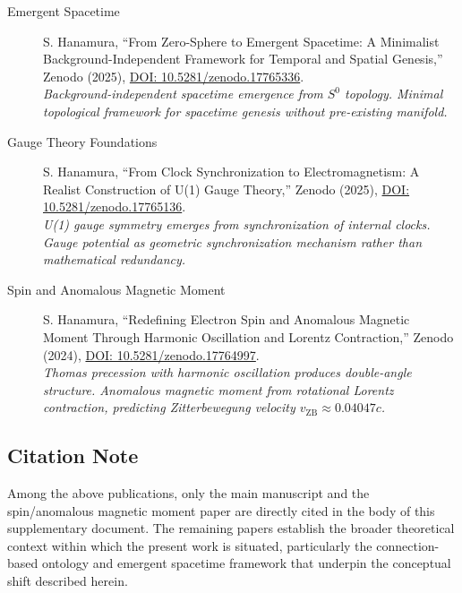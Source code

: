 \documentclass[12pt,letterpaper]{article}
\begin{document}
\begin{description}
\item[Emergent Spacetime] S. Hanamura, ``From Zero-Sphere to Emergent Spacetime: A Minimalist Background-Independent Framework for Temporal and Spatial Genesis,'' Zenodo (2025), \href{https://doi.org/10.5281/zenodo.17765336}{DOI: 10.5281/zenodo.17765336}. \\
\textit{Background-independent spacetime emergence from $S^0$ topology. Minimal topological framework for spacetime genesis without pre-existing manifold.}

\item[Gauge Theory Foundations] S. Hanamura, ``From Clock Synchronization to Electromagnetism: A Realist Construction of U(1) Gauge Theory,'' Zenodo (2025), \href{https://doi.org/10.5281/zenodo.17765136}{DOI: 10.5281/zenodo.17765136}. \\
\textit{U(1) gauge symmetry emerges from synchronization of internal clocks. Gauge potential as geometric synchronization mechanism rather than mathematical redundancy.}

\item[Spin and Anomalous Magnetic Moment] S. Hanamura, ``Redefining Electron Spin and Anomalous Magnetic Moment Through Harmonic Oscillation and Lorentz Contraction,'' Zenodo (2024), \href{https://doi.org/10.5281/zenodo.17764997}{DOI: 10.5281/zenodo.17764997}. \\
\textit{Thomas precession with harmonic oscillation produces double-angle structure. Anomalous magnetic moment from rotational Lorentz contraction, predicting Zitterbewegung velocity $v_{\mathrm{ZB}} \approx 0.04047c$.}
\end{description}


\subsection*{Citation Note}

Among the above publications, only the main manuscript and the spin/anomalous magnetic moment paper are directly cited in the body of this supplementary document. The remaining papers establish the broader theoretical context within which the present work is situated, particularly the connection-based ontology and emergent spacetime framework that underpin the conceptual shift described herein.

\end{document}
